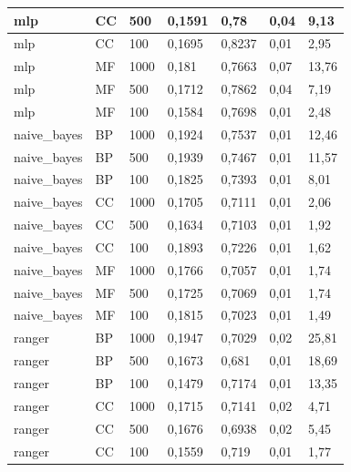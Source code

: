 \documentclass[12pt]{report}
\begin{document}
\begin{appendices}
\begin{longtable}[h]{|l|l|l|l|l|l|l|}
mlp          & CC   & 500     & 0,1591 & 0,78   & 0,04            & 9,13        \\ \hline
mlp          & CC   & 100     & 0,1695 & 0,8237 & 0,01            & 2,95        \\ \hline
mlp          & MF   & 1000    & 0,181  & 0,7663 & 0,07            & 13,76       \\ \hline
mlp          & MF   & 500     & 0,1712 & 0,7862 & 0,04            & 7,19        \\ \hline
mlp          & MF   & 100     & 0,1584 & 0,7698 & 0,01            & 2,48        \\ \hline
naive\_bayes & BP   & 1000    & 0,1924 & 0,7537 & 0,01            & 12,46       \\ \hline
naive\_bayes & BP   & 500     & 0,1939 & 0,7467 & 0,01            & 11,57       \\ \hline
naive\_bayes & BP   & 100     & 0,1825 & 0,7393 & 0,01            & 8,01        \\ \hline
naive\_bayes & CC   & 1000    & 0,1705 & 0,7111 & 0,01            & 2,06        \\ \hline
naive\_bayes & CC   & 500     & 0,1634 & 0,7103 & 0,01            & 1,92        \\ \hline
naive\_bayes & CC   & 100     & 0,1893 & 0,7226 & 0,01            & 1,62        \\ \hline
naive\_bayes & MF   & 1000    & 0,1766 & 0,7057 & 0,01            & 1,74        \\ \hline
naive\_bayes & MF   & 500     & 0,1725 & 0,7069 & 0,01            & 1,74        \\ \hline
naive\_bayes & MF   & 100     & 0,1815 & 0,7023 & 0,01            & 1,49        \\ \hline
ranger       & BP   & 1000    & 0,1947 & 0,7029 & 0,02            & 25,81       \\ \hline
ranger       & BP   & 500     & 0,1673 & 0,681  & 0,01            & 18,69       \\ \hline
ranger       & BP   & 100     & 0,1479 & 0,7174 & 0,01            & 13,35       \\ \hline
ranger       & CC   & 1000    & 0,1715 & 0,7141 & 0,02            & 4,71        \\ \hline
ranger       & CC   & 500     & 0,1676 & 0,6938 & 0,02            & 5,45        \\ \hline
ranger       & CC   & 100     & 0,1559 & 0,719  & 0,01            & 1,77        \\ \hline

\end{longtable}
\end{appendices}
\end{document}
